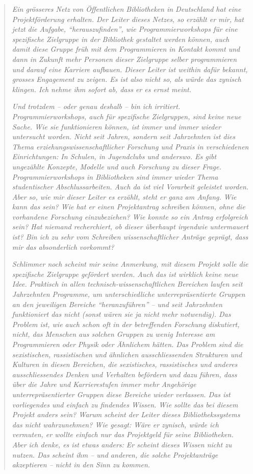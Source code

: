 \documentclass[a4paper,
fontsize=11pt,
oneside,
numbers=noperiodatend,
parskip=half-,
bibliography=totoc,
final
]{scrartcl}
\begin{document}
\begin{quote}
\emph{Ein grösseres Netz von Öffentlichen Bibliotheken in Deutschland
hat eine Projektförderung erhalten. Der Leiter dieses Netzes, so erzählt
er mir, hat jetzt die Aufgabe, \enquote{herauszufinden}, wie
Programmierworkshops für eine spezifische Zielgruppe in der Bibliothek
gestaltet werden können, auch damit diese Gruppe früh mit dem
Programmieren in Kontakt kommt und dann in Zukunft mehr Personen dieser
Zielgruppe selber programmieren und darauf eine Karriere aufbauen.
Dieser Leiter ist weithin dafür bekannt, grosses Engagement zu zeigen.
Es ist also nicht so, als würde das zynisch klingen. Ich nehme ihm
sofort ab, dass er es ernst meint.}

\emph{Und trotzdem -- oder genau deshalb -- bin ich irritiert.
Programmierworkshops, auch für spezifische Zielgruppen, sind keine neue
Sache. Wie sie funktionieren können, ist immer und immer wieder
untersucht worden. Nicht seit Jahren, sondern seit Jahrzehnten ist dies
Thema erziehungswissenschaftlicher Forschung und Praxis in verschiedenen
Einrichtungen: In Schulen, in Jugendclubs und anderswo. Es gibt
ungezählte Konzepte, Modelle und auch Forschung zu dieser Frage.
Programmierworkshops in Bibliotheken sind immer wieder Thema
studentischer Abschlussarbeiten. Auch da ist viel Vorarbeit geleistet
worden. Aber so, wie mir dieser Leiter es erzählt, steht er ganz am
Anfang. Wie kann das sein? Wie hat er einen Projektantrag schreiben
können, ohne die vorhandene Forschung einzubeziehen? Wie konnte so ein
Antrag erfolgreich sein? Hat niemand recherchiert, ob dieser überhaupt
irgendwie untermauert ist? Bin ich zu sehr vom Schreiben
wissenschaftlicher Anträge geprägt, dass mir das absonderlich vorkommt?}

\emph{Schlimmer noch scheint mir seine Anmerkung, mit diesem Projekt
solle die spezifische Zielgruppe gefördert werden. Auch das ist wirklich
keine neue Idee. Praktisch in allen technisch-wissenschaftlichen
Bereichen laufen seit Jahrzehnten Programme, um unterschiedliche
unterrepräsentierte Gruppen an den jeweiligen Bereiche
\enquote{heranzuführen} -- und seit Jahrzehnten funktioniert das nicht
(sonst wären sie ja nicht mehr notwendig). Das Problem ist, wie auch
schon oft in der betreffenden Forschung diskutiert, nicht, das Menschen
aus solchen Gruppen zu wenig Interesse am Programmieren oder Physik oder
Ähnlichem hätten. Das Problem sind die sexistischen, rassistischen und
ähnlichen ausschliessenden Strukturen und Kulturen in diesen Bereichen,
die sexistisches, rassistisches und anderes ausschliessendes Denken und
Verhalten befördern und dazu führen, dass über die Jahre und
Karrierestufen immer mehr Angehörige unterrepräsentierter Gruppen diese
Bereiche wieder verlassen. Das ist vorliegendes und einfach zu findendes
Wissen. Wie sollte das bei diesem Projekt anders sein? Warum scheint der
Leiter dieses Bibliothekssystems das nicht wahrzunehmen? Wie gesagt:
Wäre er zynisch, würde ich vermuten, er wollte einfach nur das
Projektgeld für seine Bibliotheken. Aber ich denke, es ist etwas anders:
Er scheint dieses Wissen nicht zu nutzen. Das scheint ihm -- und
anderen, die solche Projektanträge akzeptieren -- nicht in den Sinn zu
kommen.}
\end{quote}
\end{document}
